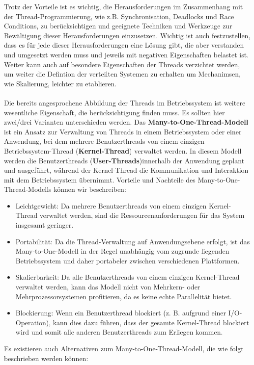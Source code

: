 \documentclass[../vs-script-first-v01.tex]{subfiles}
\begin{document}
Trotz der Vorteile ist es wichtig, die Herausforderungen im Zusammenhang mit der Thread-Programmierung, wie z.B. Synchronisation, Deadlocks und Race Conditions, zu berücksichtigen und geeignete Techniken und Werkzeuge zur Bewältigung dieser Herausforderungen einzusetzen. Wichtig ist auch festzustellen, dass es für jede dieser Herausforderungen eine Lösung gibt, die aber verstanden und umgesetzt werden muss und jeweils mit negativen Eigenschaften belastet ist. Weiter kann auch auf besondere Eigenschaften der Threads verzichtet werden, um weiter die Defintion der verteilten Systemen zu erhalten um Mechanimsen, wie Skalierung, leichter zu etablieren.
\\\\
Die bereits angesprochene Abbildung der Threads im Betriebssystem ist weitere wesentliche Eigenschaft, die berücksichtigung finden muss. Es sollten hier zwei/drei Varianten unterschieden werden. Das \textbf{Many-to-One-Thread-Modell} ist ein Ansatz zur Verwaltung von Threads in einem Betriebssystem oder einer Anwendung, bei dem mehrere Benutzerthreads von einem einzigen Betriebssystem-Thread (\textbf{Kernel-Thread}) verwaltet werden. In diesem Modell werden die Benutzerthreads (\textbf{User-Threads})innerhalb der Anwendung geplant und ausgeführt, während der Kernel-Thread die Kommunikation und Interaktion mit dem Betriebssystem übernimmt. Vorteile und Nachteile des Many-to-One-Thread-Modells können wir beschreiben:
\begin{itemize}
\item Leichtgewicht: Da mehrere Benutzerthreads von einem einzigen Kernel-Thread verwaltet werden, sind die Ressourcenanforderungen für das System insgesamt geringer.
\item Portabilität: Da die Thread-Verwaltung auf Anwendungsebene erfolgt, ist das Many-to-One-Modell in der Regel unabhängig vom zugrunde liegenden Betriebssystem und daher portabeler zwischen verschiedenen Plattformen.
\item Skalierbarkeit: Da alle Benutzerthreads von einem einzigen Kernel-Thread verwaltet werden, kann das Modell nicht von Mehrkern- oder Mehrprozessorsystemen profitieren, da es keine echte Parallelität bietet.
\item Blockierung: Wenn ein Benutzerthread blockiert (z. B. aufgrund einer I/O-Operation), kann dies dazu führen, dass der gesamte Kernel-Thread blockiert wird und somit alle anderen Benutzerthreads zum Erliegen kommen.
\end{itemize}
Es existieren auch Alternativen zum Many-to-One-Thread-Modell, die wie folgt beschrieben werden können:
\end{document}
